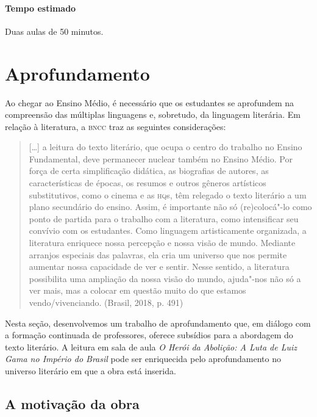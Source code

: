 \documentclass[12pt]{extarticle}
\begin{document}
\paragraph{Tempo estimado} Duas aulas de 50 minutos.

\section{Aprofundamento}

Ao chegar ao Ensino Médio, é necessário que os estudantes se aprofundem
na compreensão das múltiplas linguagens e, sobretudo, da linguagem
literária. Em relação à literatura, a \textsc{bncc} traz as seguintes
considerações:

\begin{quote}
{[}\ldots{}{]} a leitura do texto literário, que ocupa o centro do trabalho
no Ensino Fundamental, deve permanecer nuclear também no Ensino Médio.
Por força de certa simplificação didática, as biografias de autores, as
características de épocas, os resumos e outros gêneros artísticos
substitutivos, como o cinema e as \textsc{hq}s, têm relegado o texto literário a
um plano secundário do ensino. Assim, é importante não só (re)colocá"-lo
como ponto de partida para o trabalho com a literatura, como
intensificar seu convívio com os estudantes. Como linguagem
artisticamente organizada, a literatura enriquece nossa percepção e
nossa visão de mundo. Mediante arranjos especiais das palavras, ela cria
um universo que nos permite aumentar nossa capacidade de ver e sentir.
Nesse sentido, a literatura possibilita uma ampliação da nossa visão do
mundo, ajuda"-nos não só a ver mais, mas a colocar em questão muito do
que estamos vendo/vivenciando. (Brasil, 2018, p. 491)
\end{quote}

Nesta seção, desenvolvemos um trabalho de aprofundamento que, em diálogo
com a formação continuada de professores, oferece subsídios para a
abordagem do texto literário. A leitura em sala de aula \emph{O Herói da
Abolição: A Luta de Luiz Gama no Império do Brasil} pode ser enriquecida
pelo aprofundamento no universo literário em que a obra está inserida.




\subsection{A motivação da obra}
\end{document}

